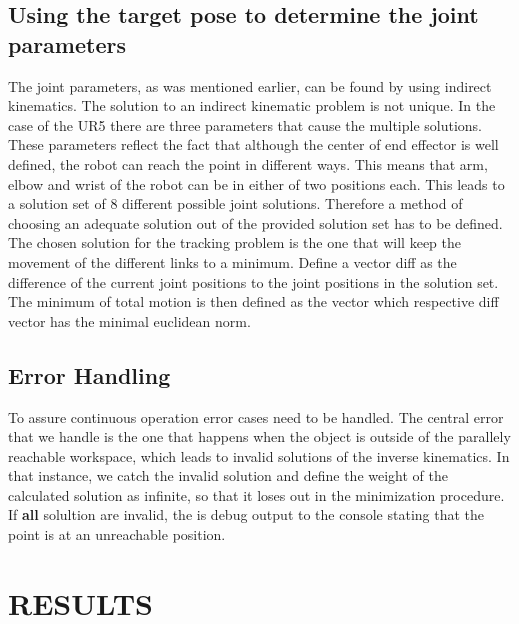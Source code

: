 \documentclass[letterpaper, 10 pt, conference]{IEEEconf}  %
\begin{document}

\subsection{Using the target pose to determine the joint parameters}

The joint parameters, as was mentioned earlier, can be found by using indirect kinematics. The solution to an indirect kinematic problem is not unique. In the case of the UR5 there are three parameters that cause the multiple solutions. These parameters reflect the fact that although the center of end effector is well defined, the robot can reach the point in different ways. This means that arm, elbow and wrist of the robot can be in either of two positions each. This leads to a solution set of 8 different possible joint solutions.
Therefore a method of choosing an adequate solution out of the provided solution set has to be defined. \\
The chosen solution for the tracking problem is the one that will keep the movement of the different links to a minimum. Define a vector diff as the difference of the current joint positions to the joint positions in the solution set. The minimum of total motion is then defined as the vector which respective diff vector has the minimal euclidean norm. 


\subsection{Error Handling}
To assure continuous operation error cases need to be handled. The central error that we handle is the one that happens when
the object is outside of the parallely reachable workspace, which leads to invalid solutions of the inverse kinematics. In that instance, we catch the invalid solution and define the weight of the calculated solution as infinite, so that it loses out in the minimization procedure. If \textbf{all} solultion are invalid, the is debug output to the console stating that the point is at an unreachable position. 

\section{RESULTS}

\end{document}
